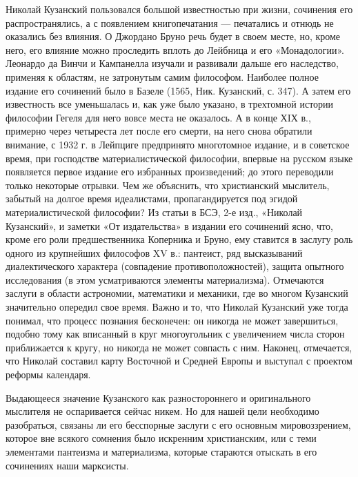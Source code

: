 Николай   Кузанский  пользовался   большой  известностью   при  жизни,
сочинения  его распространялись,  а  с  появлением книгопечатания  ---
печатались и  отнюдь не оказались  без влияния. О Джордано  Бруно речь
будет  в своем  месте, но,  кроме него,  его влияние  можно проследить
вплоть до Лейбница и его «Монадологии». Леонардо да Винчи и Кампанелла
изучали и  развивали дальше  его наследство,  применяя к  областям, не
затронутым самим философом. Наиболее полное издание его сочинений было
в Базеле (1565,  Ник. Кузанский, с. 347). А затем  его известность все
уменьшалась и,  как уже было  указано, в трехтомной  истории философии
Гегеля  для  него  вовсе  места  не  оказалось.  А  в  конце  ХIХ  в.,
примерно через четыреста лет после  его смерти, на него снова обратили
внимание, с  1932 г. в  Лейпциге предпринято многотомное издание,  и в
советское время, при  господстве материалистической философии, впервые
на русском языке появляется первое издание его избранных произведений;
до  этого  переводили  только  некоторые отрывки.  Чем  же  объяснить,
что  христианский  мыслитель,  забытый на  долгое  время  идеалистами,
пропагандируется под эгидой материалистической  философии? Из статьи в
БСЭ,  2-е изд.,  «Николай Кузанский»,  и заметки  «От издательства»  в
издании  его  сочинений  ясно,  что, кроме  его  роли  предшественника
Коперника и  Бруно, ему ставится  в заслугу роль одного  из крупнейших
философов XV в.: пантеист,  ряд высказываний диалектического характера
(совпадение противоположностей), защита  опытного исследования (в этом
усматриваются  элементы материализма).  Отмечаются  заслуги в  области
астрономии, математики и механики, где во многом Кузанский значительно
опередил  свое время.  Важно и  то,  что Николай  Кузанский уже  тогда
понимал,  что  процесс  познания   бесконечен:  он  никогда  не  может
завершиться,  подобно  тому  как  вписанный  в  круг  многоугольник  с
увеличением числа  сторон приближается  к кругу,  но никогда  не может
совпасть  с  ним.  Наконец,  отмечается, что  Николай  составил  карту
Восточной и Средней Европы и выступал с проектом реформы календаря.

Выдающееся  значение Кузанского  как  разностороннего и  оригинального
мыслителя   не  оспаривается   сейчас   никем.  Но   для  нашей   цели
необходимо  разобраться,  связаны  ли  его бесспорные  заслуги  с  его
основным мировоззрением,  которое вне всякого сомнения  было искренним
христианским, или с теми  элементами пантеизма и материализма, которые
стараются отыскать в его сочинениях наши марксисты.

